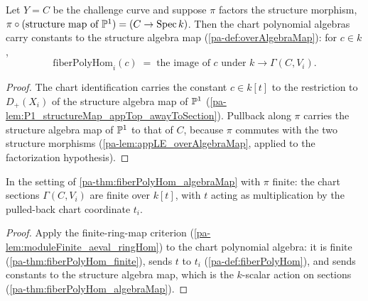 \begin{theorem}
  \label{pa-thm:fiberPolyHom_algebraMap}
  \leanok

  Let \(Y = C\) be the challenge curve and suppose \(\pi\) factors the structure
  morphism, \(\pi \circ (\text{structure map of } \mathbb{P}^1) = (C \to \operatorname{Spec} k)\). Then the
  chart polynomial algebras carry constants to the structure algebra map
  (\ref{pa-def:overAlgebraMap}): for \(c \in k\),
  \[
    \text{fiberPolyHom}_i(c) \;=\; \text{the image of } c \text{ under }
      k \to \Gamma(C, V_i).
  \]
\end{theorem}
\begin{proof}
  \leanok
  The chart identification carries the constant \(c \in k[t]\) to the restriction to
  \(D_+(X_i)\) of the structure algebra map of \(\mathbb{P}^1\)
  (\ref{pa-lem:P1_structureMap_appTop_awayToSection}). Pullback along \(\pi\) carries the
  structure algebra map of \(\mathbb{P}^1\) to that of \(C\), because \(\pi\) commutes with
  the two structure morphisms (\ref{pa-lem:appLE_overAlgebraMap}, applied to the
  factorization hypothesis).
\end{proof}

\begin{theorem}
  \label{pa-thm:moduleFinite_aeval_fiberCoord}
  \leanok

  In the setting of \ref{pa-thm:fiberPolyHom_algebraMap} with \(\pi\) finite: the chart
  sections \(\Gamma(C, V_i)\) are finite over \(k[t]\), with \(t\) acting as
  multiplication by the pulled-back chart coordinate \(t_i\).
\end{theorem}
\begin{proof}
  \leanok
  Apply the finite-ring-map criterion (\ref{pa-lem:moduleFinite_aeval_ringHom}) to the
  chart polynomial algebra: it is finite (\ref{pa-thm:fiberPolyHom_finite}), sends \(t\)
  to \(t_i\) (\ref{pa-def:fiberPolyHom}), and sends constants to the structure algebra
  map, which is the \(k\)-scalar action on sections
  (\ref{pa-thm:fiberPolyHom_algebraMap}).
\end{proof}

